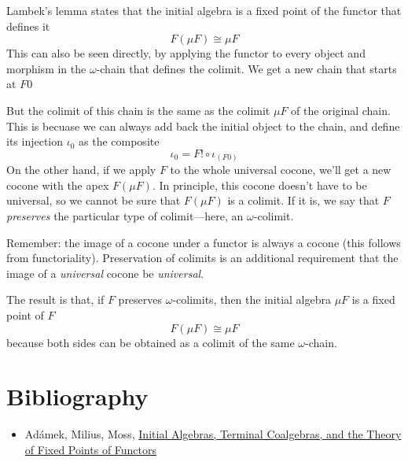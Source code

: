 \documentclass[11pt]{amsart}
\begin{document}
Lambek's lemma states that the initial algebra is a fixed point of the functor that defines it
\[F (\mu F) \cong \mu F\]
This can also be seen directly, by applying the functor to every object and morphism in the $\omega$-chain that defines the colimit. We get a new chain that starts at $F 0$
\begin{figure}[H]
\centering
{}
\end{figure}
But the colimit of this chain is the same as the colimit $\mu F$ of the original chain. This is becuase we can always add back the initial object to the chain, and define its injection $\iota_0$ as the composite  
\[\iota_0 = F ! \circ \iota_{(F 0)} \]
On the other hand, if we apply $F$ to the whole universal cocone, we'll get a new cocone with the apex $F (\mu F)$. In principle, this cocone doesn't have to be universal, so we cannot be sure that $F (\mu F)$ is a colimit. If it is, we say that $F$ \textit{preserves} the particular type of colimit---here, an $\omega$-colimit. 

Remember: the image of a cocone under a functor is always a cocone (this follows from functoriality). Preservation of colimits is an additional requirement that the image of a \textit{universal} cocone be \textit{universal}. 

The result is that, if $F$ preserves $\omega$-colimits, then the initial algebra $\mu F$ is a fixed point of $F$
\[F(\mu F) \cong \mu F\]
because both sides can be obtained as a colimit of the same $\omega$-chain. 

\section{Bibliography}
\begin{itemize}
\item Ad\'amek, Milius, Moss, \href{https://www8.cs.fau.de/staff/milius/publications/files/CoalgebraBook.pdf}{Initial Algebras, Terminal Coalgebras, and
the Theory of Fixed Points of Functors}
\end{itemize}
\end{document}
